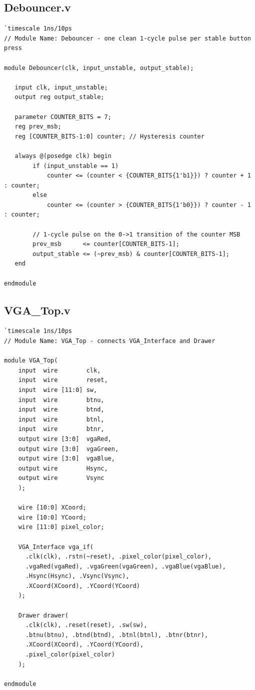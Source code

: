 \documentclass[11pt,a4paper]{article}
\begin{document}
\newpage
\subsection*{Debouncer.v}
\begin{lstlisting}
`timescale 1ns/10ps
// Module Name: Debouncer - one clean 1-cycle pulse per stable button press

module Debouncer(clk, input_unstable, output_stable);

   input clk, input_unstable;
   output reg output_stable;

   parameter COUNTER_BITS = 7;
   reg prev_msb;
   reg [COUNTER_BITS-1:0] counter; // Hysteresis counter

   always @(posedge clk) begin
        if (input_unstable == 1)
            counter <= (counter < {COUNTER_BITS{1'b1}}) ? counter + 1 : counter;
        else
            counter <= (counter > {COUNTER_BITS{1'b0}}) ? counter - 1 : counter;

        // 1-cycle pulse on the 0->1 transition of the counter MSB
        prev_msb      <= counter[COUNTER_BITS-1];
        output_stable <= (~prev_msb) & counter[COUNTER_BITS-1];
   end

endmodule
\end{lstlisting}

\newpage
\subsection*{VGA\_Top.v}
\begin{lstlisting}
`timescale 1ns/10ps
// Module Name: VGA_Top - connects VGA_Interface and Drawer

module VGA_Top(
    input  wire        clk,
    input  wire        reset,
    input  wire [11:0] sw,
    input  wire        btnu,
    input  wire        btnd,
    input  wire        btnl,
    input  wire        btnr,
    output wire [3:0]  vgaRed,
    output wire [3:0]  vgaGreen,
    output wire [3:0]  vgaBlue,
    output wire        Hsync,
    output wire        Vsync
    );

    wire [10:0] XCoord;
    wire [10:0] YCoord;
    wire [11:0] pixel_color;

    VGA_Interface vga_if(
      .clk(clk), .rstn(~reset), .pixel_color(pixel_color),
      .vgaRed(vgaRed), .vgaGreen(vgaGreen), .vgaBlue(vgaBlue),
      .Hsync(Hsync), .Vsync(Vsync),
      .XCoord(XCoord), .YCoord(YCoord)
    );

    Drawer drawer(
      .clk(clk), .reset(reset), .sw(sw),
      .btnu(btnu), .btnd(btnd), .btnl(btnl), .btnr(btnr),
      .XCoord(XCoord), .YCoord(YCoord),
      .pixel_color(pixel_color)
    );

endmodule
\end{lstlisting}
\end{document}
